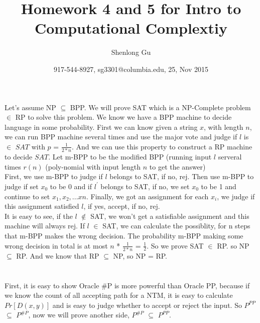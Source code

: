 \documentclass[11pt]{article}
\title{Homework 4 and 5 for Intro to Computational Complextiy}
\author{Shenlong Gu}
\date{917-544-8927, sg3301@columbia.edu, 25, Nov 2015}
\begin{document}
\maketitle
\part{}
Let's assume NP $\subseteq$ BPP. We will prove SAT which is a NP-Complete problem $\in$ RP to solve this problem. We know we have a BPP machine to decide language in some probability. First we can know given a string $x$, with length $n$, we can run BPP machine several times and use the major vote and judge if $l$ is $\in$ $SAT$ with $p$ = $\frac{1}{2 * n}$. And we can use this property to construct a RP machine to decide $SAT$. Let m-BPP to be the modified BPP (running input $l$ serveral times $r(n)$ (poly-nomial with input length $n$ to get the answer) \\
First, we use m-BPP to judge if $l$ belongs to SAT, if no, rej. Then use m-BPP to judge if set $x_{0}$ to be 0 and if $l^{'}$ belongs to SAT, if no, we set $x_{0}$ to be 1 and continue to set $x_{1}, x_{2}, ...x{n}$. Finally, we got an assignment for each $x_{i}$, we judge if this assignment satisfied $l$, if yes, accept, if no, rej. \\ 
It is easy to see, if the $l$ $\notin$ SAT, we won't get a satisfiable assignment and this machine will always rej. If $l$ $\in$ SAT, we can calculate the possiblity, for n steps that m-BPP makes the wrong decision. The probability m-BPP making some wrong decision in total is at most $n$ * $\frac{1}{2 * n}$ = $\frac{1}{2}$. So we prove SAT $\in$ RP. so NP $\subseteq$ RP. And we know that RP $\subseteq$ NP, so NP = RP.
\part{}
First, it is easy to show Oracle \#P is more powerful than Oracle PP, because if we know the count of all accepting path for a NTM, it is easy to calculate $Pr[D(x,y)]$ and is easy to judge whether to accept or reject the input. So $P^{PP}$ $\subseteq$ $P^{\#P}$, now we will prove another side, $P^{\#P}$ $\subseteq$ $P^{PP}$. 
\end{document}
